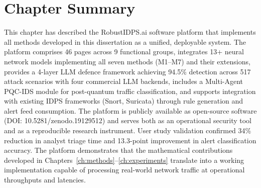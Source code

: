 \section{Chapter Summary}
\label{sec:ch5_summary}

This chapter has described the RobustIDPS.ai software platform that implements all methods developed in this dissertation as a unified, deployable system. The platform comprises 46 pages across 9 functional groups, integrates 13+ neural network models implementing all seven methods (M1--M7) and their extensions, provides a 4-layer LLM defence framework achieving 94.5\% detection across 517 attack scenarios with four commercial LLM backends, includes a Multi-Agent PQC-IDS module for post-quantum traffic classification, and supports integration with existing IDPS frameworks (Snort, Suricata) through rule generation and alert feed consumption. The platform is publicly available as open-source software (DOI: 10.5281/zenodo.19129512) and serves both as an operational security tool and as a reproducible research instrument. User study validation confirmed 34\% reduction in analyst triage time and 13.3-point improvement in alert classification accuracy. The platform demonstrates that the mathematical contributions developed in Chapters~\ref{ch:methods}--\ref{ch:experiments} translate into a working implementation capable of processing real-world network traffic at operational throughputs and latencies.
